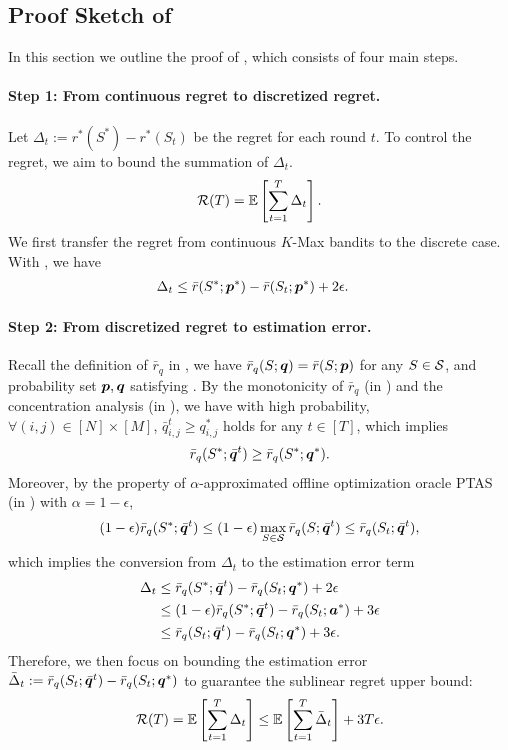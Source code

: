 \subsection{Proof Sketch of }
In this section we outline the proof of , which consists of four main steps. 

\paragraph{Step 1: From continuous regret to discretized regret.}
Let $\Delta_t := r^*(S^*) - r^*(S_t)$ be the regret for each round $t$. To control the regret, we aim to bound the summation of $\Delta_t$. 
$$ {\mathcal{R}}(T) = \mathbb{E}\left[\sum_{t=1}^T \Delta_t \right]. $$
We first transfer the regret from continuous $K$-Max bandits to the discrete case. With , we have
\begin{align*}
    \Delta_t &\le  \bar r(S^*; {\bm{p}}^*) - \bar r(S_t; {\bm{p}}^*) + 2\epsilon.
\end{align*}


\paragraph{Step 2: From discretized regret to estimation error.}
%
Recall the definition of $\bar r_q$ in , we have $\bar r_q(S; {\bm{q}}) = \bar r(S; {\bm{p}})$ for any $S \in {\mathcal{S}}$, and probability set ${\bm{p}}, {\bm{q}}$ satisfying . 
By the monotonicity of $\bar r_q$ (in ) and the concentration analysis (in ),
we have with high probability, $\forall (i,j)\in[N]\times[M]$, $\bar q_{i,j}^t \ge q^*_{i,j}$ holds for any $t \in [T]$, which implies
\begin{align*}
    \bar r_q(S^*;\bar{{\bm{q}}}^t) \ge \bar r_q(S^*; {\bm{q}}^*).
\end{align*}
Moreover, by the property of $\alpha$-approximated offline optimization oracle PTAS \citep{chen2016combinatorial}  (in ) with $\alpha = 1 - \epsilon$, 
\begin{align*}
    (1 - \epsilon) \bar r_q(S^*; \bar {{\bm{q}}}^t) \le (1 - \epsilon) \max_{S \in {\mathcal{S}}} \bar r_q(S; \bar {{\bm{q}}}^t) \le \bar r_q(S_t; \bar {{\bm{q}}}^t),
\end{align*}
which implies the conversion from $\Delta_t$ to the estimation error term
\begin{align*}
    \Delta_t &\le \bar r_q(S^*; \bar {{\bm{q}}}^t) - \bar r_q(S_t; {\bm{q}}^*) + 2\epsilon \\
    &\le (1 - \epsilon) \bar r_q(S^*; \bar {{\bm{q}}}^t) - \bar r_q(S_t; {\bm{a}}^*) + 3\epsilon \\
    &\le \bar r_q(S_t; \bar {{\bm{q}}}^t) - \bar r_q(S_t; {\bm{q}}^*) + 3\epsilon.
\end{align*}
Therefore, we then focus on bounding the estimation error $\bar\Delta_t := \bar r_q(S_t; \bar {{\bm{q}}}^t) - \bar r_q(S_t; {\bm{q}}^*)$ to guarantee the sublinear regret upper bound:
\begin{align}\label{eq:regret-to-bar-delta}
    {\mathcal{R}}(T) = \mathbb{E}\left[\sum_{t=1}^T \Delta_t \right] \le \mathbb{E}\left[\sum_{t=1}^T \bar\Delta_t \right] + 3T\epsilon.
\end{align}


